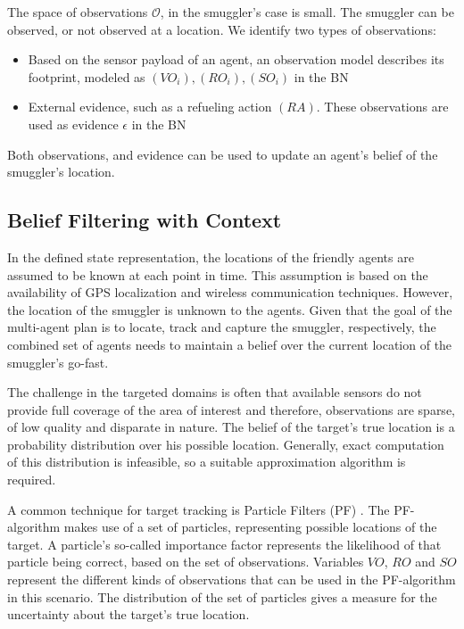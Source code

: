 \documentclass[conference]{IEEEtran}
\begin{document}
The space of observations $\mathcal{O}$, in the smuggler's case is small. The smuggler can be observed, or not observed at a location. We identify two types of observations:
\begin{itemize}
\item Based on the sensor payload of an agent, an observation model describes its footprint, modeled as $(VO_i), (RO_i), (SO_i)$ in the BN
\item External evidence, such as a refueling action $(RA)$. These observations are used as evidence $\epsilon$ in the BN
\end{itemize}
Both observations, and evidence can be used to update an agent's belief of the smuggler's location.

\subsection{Belief Filtering with Context}
\label{subsec:belief-filter}

In the defined state representation, the locations of the friendly agents are assumed to be known at each point in time. This assumption is based on the availability of GPS localization and wireless communication techniques. However, the location of the smuggler is unknown to the agents. Given that the goal of the multi-agent plan is to locate, track and capture the smuggler, respectively, the combined set of agents needs to maintain a belief over the current location of the smuggler's go-fast.

The challenge in the targeted domains is often that available sensors do not provide full coverage of the area of interest and therefore, observations are sparse, of low quality and disparate in nature. The belief of the target's true location is a probability distribution over his possible location. Generally, exact computation of this distribution is infeasible, so a suitable approximation algorithm is required.

A common technique for target tracking is Particle Filters (PF) \cite{Blackman1999}. The PF-algorithm makes use of a set of particles, representing possible locations of the target. A particle's so-called importance factor represents the likelihood of that particle being correct, based on the set of observations. Variables $VO$, $RO$ and $SO$ represent the different kinds of observations that can be used in the PF-algorithm in this scenario. The distribution of the set of particles gives a measure for the uncertainty about the target's true location.
\end{document}
